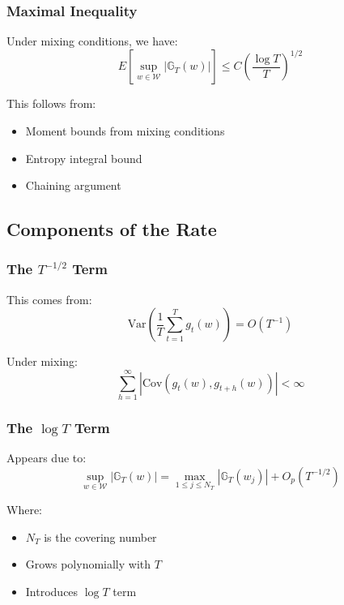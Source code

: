 \documentclass[12pt,article]{memoir}
\begin{document}
\subsubsection{Maximal Inequality}

Under mixing conditions, we have:
\begin{equation}
    E[\sup_{w \in \mathcal{W}} |\mathbb{G}_T(w)|] \leq C\left(\frac{\log T}{T}\right)^{1/2}
\end{equation}

This follows from:
\begin{itemize}
    \item Moment bounds from mixing conditions
    \item Entropy integral bound
    \item Chaining argument
\end{itemize}

\subsection{Components of the Rate}

\subsubsection{The $T^{-1/2}$ Term}

This comes from:
\begin{equation}
    \text{Var}\left(\frac{1}{T}\sum_{t=1}^T g_t(w)\right) = O(T^{-1})
\end{equation}

Under mixing:
\begin{equation}
    \sum_{h=1}^{\infty} |\text{Cov}(g_t(w), g_{t+h}(w))| < \infty
\end{equation}

\subsubsection{The $\log T$ Term}

Appears due to:
\begin{equation}
    \sup_{w \in \mathcal{W}} |\mathbb{G}_T(w)| = \max_{1 \leq j \leq N_T} |\mathbb{G}_T(w_j)| + O_p(T^{-1/2})
\end{equation}

Where:
\begin{itemize}
    \item $N_T$ is the covering number
    \item Grows polynomially with $T$
    \item Introduces $\log T$ term
\end{itemize}
\end{document}
